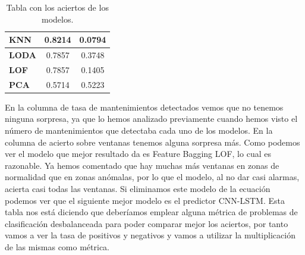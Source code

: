\begin{table}[H]
\begin{tabular}{|l|c|c|}
		\textbf{KNN}                          & \textbf{0.8214}                                                                   & 0.0794                                                                    \\ \hline
		\textbf{LODA}                         & 0.7857                                                                            & 0.3748                                                                    \\ \hline
		\textbf{LOF}                          & 0.7857                                                                            & 0.1405                                                                    \\ \hline
		\textbf{PCA}                          & 0.5714                                                                            & 0.5223                                                                    \\ \hline
	\end{tabular}
	\caption{Tabla con los aciertos de los modelos.}
	\label{tabla:resultados3}
\end{table}

En la columna de tasa de mantenimientos detectados vemos que no tenemos ninguna sorpresa, ya que lo hemos analizado previamente cuando hemos visto el número de mantenimientos que detectaba cada uno de los modelos. En la columna de acierto sobre ventanas tenemos alguna sorpresa más. Como podemos ver el modelo que mejor resultado da es Feature Bagging LOF, lo cual es razonable. Ya hemos comentado que hay muchas más ventanas en zonas de normalidad que en zonas anómalas, por lo que el modelo, al no dar casi alarmas, acierta casi todas las ventanas. Si eliminamos este modelo de la ecuación podemos ver que el siguiente mejor modelo es el predictor CNN-LSTM. Esta tabla nos está diciendo que deberíamos emplear alguna métrica de problemas de clasificación desbalanceada para poder comparar mejor los aciertos, por tanto vamos a ver la tasa de positivos y negativos y vamos a utilizar la multiplicación de las mismas como métrica.


